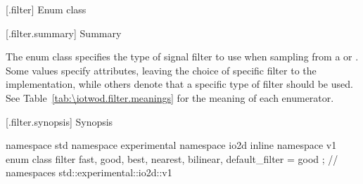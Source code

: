  [\iotwod.filter] {Enum class }

 [\iotwod.filter.summary] { Summary}

\pnum
The  enum class specifies the type of signal filter to use when 
sampling from a  or . Some values specify 
attributes, leaving the choice of specific filter to the implementation, while 
others denote that a specific type of filter should be used. See 
Table~\ref{tab:\iotwod.filter.meanings} for the meaning of each
 enumerator.

 [\iotwod.filter.synopsis] { Synopsis}

\begin{codeblock}
namespace std { namespace experimental { namespace io2d { inline namespace v1 {
  enum class filter {
    fast,
    good,
    best,
    nearest,
    bilinear,
    default_filter = good
  };
} } } } // namespaces std::experimental::io2d::v1
\end{codeblock}

